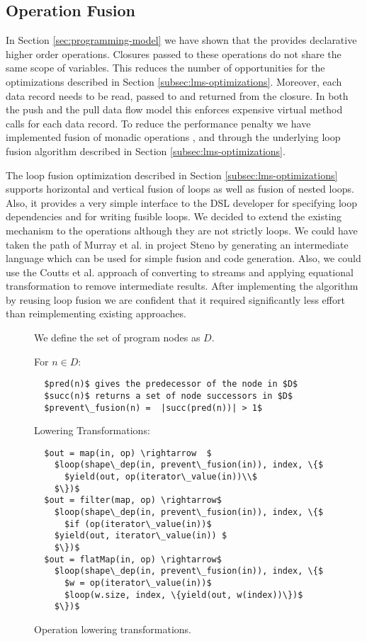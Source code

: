 \subsection{Operation Fusion}
\label{sec:fusion}

In Section \ref{sec:programming-model} we have shown that the 
provides declarative higher order operations. Closures passed to these
operations do not share the same scope of variables. This reduces the number of
opportunities for the optimizations described in Section
\ref{subsec:lms-optimizations}. Moreover, each data record needs to be read,
passed to and returned from the closure. In both the push and the pull data flow
model this enforces expensive virtual method calls \cite{murray_steno:_2011} for
each data record. To reduce the performance penalty we have implemented fusion
of monadic operations ,  and  through the
underlying loop fusion algorithm described in Section
\ref{subsec:lms-optimizations}.

The loop fusion optimization described in Section \ref{subsec:lms-optimizations}
supports horizontal and vertical fusion of loops as well as fusion of nested
loops. Also, it provides a very simple interface to the DSL developer for
specifying loop dependencies and for writing fusible loops. We decided to extend
the existing mechanism to the  operations although they are not
strictly loops. We could have taken the path of Murray et al. in project Steno
\cite{murray_steno:_2011} by generating an intermediate language which can be
used for simple fusion and code generation. Also, we could use the Coutts et al.
\cite{coutts_stream_2007} approach of converting  to streams and
applying equational transformation to remove intermediate results. After
implementing the algorithm by reusing loop fusion we are confident that it
required significantly less effort than reimplementing existing approaches.

\begin{figure}[t]
We define the set of program  nodes as $D$.

For $n \in D$:
\begin{lstlisting} 
  $pred(n)$ gives the predecessor of the node in $D$
  $succ(n)$ returns a set of node successors in $D$
  $prevent\_fusion(n) =  |succ(pred(n))| > 1$
\end{lstlisting}

Lowering Transformations:
\begin{lstlisting}
  $out = map(in, op) \rightarrow  $
    $loop(shape\_dep(in, prevent\_fusion(in)), index, \{$
      $yield(out, op(iterator\_value(in))\\$
    $\})$
  $out = filter(map, op) \rightarrow$
    $loop(shape\_dep(in, prevent\_fusion(in)), index, \{$
      $if (op(iterator\_value(in))$
	$yield(out, iterator\_value(in)) $
    $\})$
  $out = flatMap(in, op) \rightarrow$
    $loop(shape\_dep(in, prevent\_fusion(in)), index, \{$
      $w = op(iterator\_value(in))$
      $loop(w.size, index, \{yield(out, w(index))\})$
    $\})$
\end{lstlisting}
\caption{Operation lowering transformations.}
\label{lst:lowering}
\end{figure}

